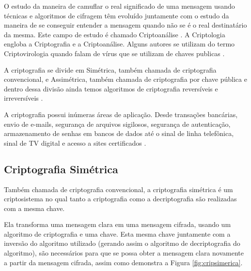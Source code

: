 O estudo da maneira de camuflar o real significado de uma mensagem usando técnicas e algoritmos de cifragem têm evoluído juntamente com o estudo da maneira de se conseguir entender a mensagem quando não se é o real destinatário da mesma. Este campo de estudo é chamado Criptoanálise \cite{gaines56}. A Criptologia engloba a Criptografia e a Criptoanálise. Alguns autores se utilizam do termo Criptovirologia quando falam de vírus que se utilizam de chaves publicas \cite{young04}.


A criptografia se divide em Simétrica, também chamada de criptografia convencional, e Assimétrica, também chamada de criptografia por chave pública \cite{stallings14} e dentro dessa divisão ainda temos algoritmos de criptografia reversíveis e irreversíveis \cite{stallings14} \cite{itu91}.

A criptografia possui inúmeras áreas de aplicação. Desde transações bancárias, envio de e-mails, segurança de arquivos sigilosos, segurança de autenticação, armazenamento de senhas em bancos de dados até o sinal de linha telefônica, sinal de TV digital e acesso a sites certificados \cite{avelino07}.

\subsection{Criptografia Simétrica}
\label{subsec:criptografiasync}
Também chamada de criptografia convencional, a criptografia simétrica é um criptosistema no qual tanto a criptografia como a decriptografia são realizadas com a mesma chave.

Ela transforma uma mensagem clara em uma mensagem cifrada, usando um algoritmo de criptografia e uma chave. Esta mesma chave juntamente com a inversão do algoritmo utilizado (gerando assim o algoritmo de decriptografia do algoritmo), são necessários para que se possa obter a mensagem clara novamente a partir da mensagem cifrada, assim como demonstra a Figura \ref{fig:cripsimerica}.

